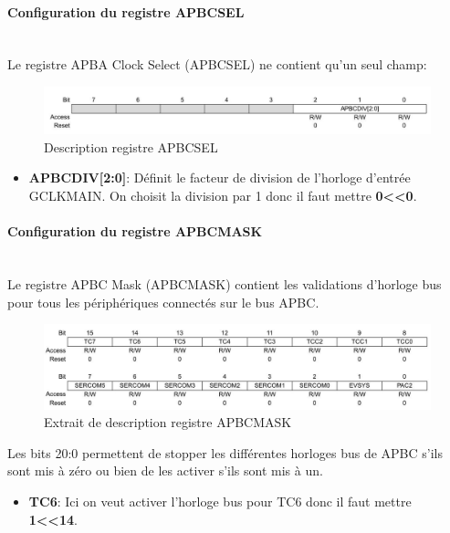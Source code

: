 \documentclass[a4paper]{article}
\begin{document}
	\paragraph{Configuration du registre APBCSEL} 
	~~\\
	Le registre APBA Clock Select (APBCSEL) ne contient qu'un seul champ:\\
	\begin{figure}[H]
		\centering
		\includegraphics[width=0.9\linewidth]{APBCSEL.jpg}
		\caption{Description registre APBCSEL}
	\end{figure}
	
	\begin{itemize}
		\item {\bf APBCDIV[2:0]}: Définit le facteur de division de l'horloge d'entrée GCLKMAIN. On choisit la division par 1 donc il faut mettre {\bf 0\textless\textless0}.~~\\
	\end{itemize}
	
	\paragraph{Configuration du registre APBCMASK} 
	~~\\
	Le registre APBC Mask (APBCMASK) contient les validations d'horloge bus pour tous les périphériques connectés sur le bus APBC.
	\begin{figure}[H]
		\centering
		\includegraphics[width=0.9\linewidth]{APBCMASK.jpg}
		\caption{Extrait de description registre APBCMASK}
	\end{figure}
	Les bits 20:0 permettent de stopper les différentes horloges bus de APBC s’ils sont mis à zéro ou bien de les activer s’ils sont mis à un.
	\begin{itemize}
		\item {\bf TC6}: Ici on veut activer l’horloge bus pour TC6 donc il faut mettre {\bf 1\textless\textless14}.~~\\
	\end{itemize}
	
\end{document}
